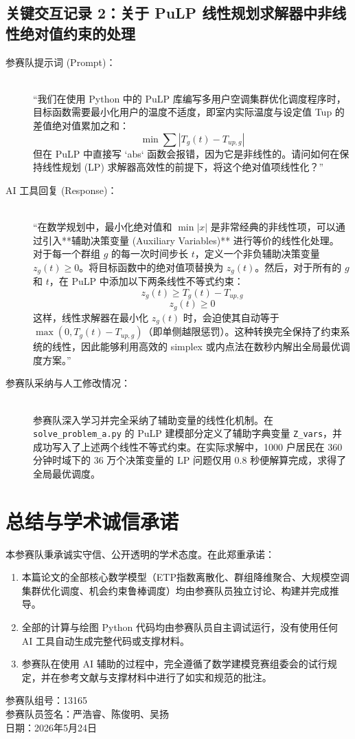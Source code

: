 \documentclass[12pt,a4paper]{article}
\begin{document}
\subsection{关键交互记录 2：关于 PuLP 线性规划求解器中非线性绝对值约束的处理}
\begin{description}
    \item[参赛队提示词 (Prompt)：] \ \\
    “我们在使用 Python 中的 PuLP 库编写多用户空调集群优化调度程序时，目标函数需要最小化用户的温度不适度，即室内实际温度与设定值 Tup 的差值绝对值累加之和：
    \[ \min \sum |T_g(t) - T_{up, g}| \]
    但在 PuLP 中直接写 `abs` 函数会报错，因为它是非线性的。请问如何在保持线性规划 (LP) 求解器高效性的前提下，将这个绝对值项线性化？”
    
    \item[AI 工具回复 (Response)：] \ \\
    “在数学规划中，最小化绝对值和 $\min |x|$ 是非常经典的非线性项，可以通过引入**辅助决策变量 (Auxiliary Variables)** 进行等价的线性化处理。\\
    对于每一个群组 $g$ 的每一次时间步长 $t$，定义一个非负辅助决策变量 $z_g(t) \ge 0$。将目标函数中的绝对值项替换为 $z_g(t)$。然后，对于所有的 $g$ 和 $t$，在 PuLP 中添加以下两条线性不等式约束：
    \[ z_g(t) \ge T_g(t) - T_{up, g} \]
    \[ z_g(t) \ge 0 \]
    这样，线性求解器在最小化 $z_g(t)$ 时，会迫使其自动等于 $\max(0, T_g(t) - T_{up, g})$（即单侧越限惩罚）。这种转换完全保持了约束系统的线性，因此能够利用高效的 simplex 或内点法在数秒内解出全局最优调度方案。”
    
    \item[参赛队采纳与人工修改情况：] \ \\
    参赛队深入学习并完全采纳了辅助变量的线性化机制。在 \lstinline!solve_problem_a.py! 的 PuLP 建模部分定义了辅助字典变量 \lstinline!Z_vars!，并成功写入了上述两个线性不等式约束。在实际求解中，1000 户居民在 360 分钟时域下的 36 万个决策变量的 LP 问题仅用 0.8 秒便解算完成，求得了全局最优调度。
\end{description}

\section{总结与学术诚信承诺}
本参赛队秉承诚实守信、公开透明的学术态度。在此郑重承诺：
\begin{enumerate}
    \item 本篇论文的全部核心数学模型（ETP指数离散化、群组降维聚合、大规模空调集群优化调度、机会约束鲁棒调度）均由参赛队员独立讨论、构建并完成推导。
    \item 全部的计算与绘图 Python 代码均由参赛队员自主调试运行，没有使用任何 AI 工具自动生成完整代码或支撑材料。
    \item 参赛队在使用 AI 辅助的过程中，完全遵循了数学建模竞赛组委会的试行规定，并在参考文献与支撑材料中进行了如实和规范的批注。
\end{enumerate}

\vspace{1.5cm}
\begin{flushright}
    参赛队组号：13165 \\
    参赛队员签名：严浩睿、陈俊明、吴扬 \\
    日期：2026年5月24日
\end{flushright}
\end{document}
